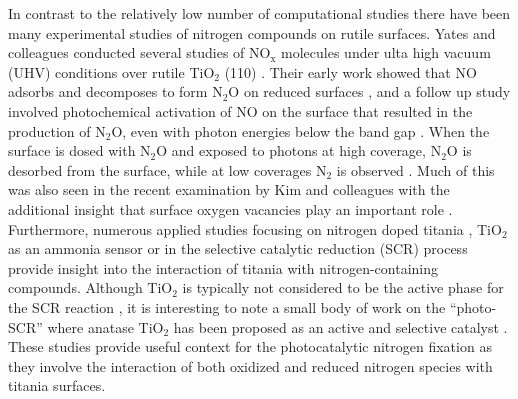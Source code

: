 \documentclass[journal=ascecg,manuscript=article,articletitle=true]{achemso}
\begin{document}
In contrast to the relatively low number of computational studies there have been many experimental studies of nitrogen compounds on rutile surfaces. Yates and colleagues conducted several studies of NO$_{\mathrm{x}}$ molecules under ulta high vacuum (UHV) conditions over rutile TiO$_2$ (110) \cite{Lu1994,Rusu2000,Rusu2001}. Their early work showed that NO adsorbs and decomposes to form N$_2$O on reduced surfaces \cite{Lu1994}, and a follow up study involved photochemical activation of NO on the surface that resulted in the production of N$_2$O, even with photon energies below the band gap \cite{Rusu2000}. When the surface is dosed with N$_2$O and exposed to photons at high coverage, N$_2$O is desorbed from the surface, while at low coverages N$_2$ is observed \cite{Rusu2001}. Much of this was also seen in the recent examination by Kim and colleagues with the additional insight that surface oxygen vacancies play an important role \cite{Kim2016,Kim2014}. Furthermore, numerous applied studies focusing on nitrogen doped titania \cite{Chen_2007}, TiO$_2$ as an ammonia sensor \cite{Karunagaran_2007,Suganuma_2015} or in the selective catalytic reduction (SCR) process \cite{Busca_1998,Ramis_1990,Giraud_2014,Liu_2017} provide insight into the interaction of titania with nitrogen-containing compounds. Although TiO$_2$ is typically not considered to be the active phase for the SCR reaction \cite{Topsoe_1994}, it is interesting to note a small body of work on the ``photo-SCR'' where anatase TiO$_2$ has been proposed as an active and selective catalyst \cite{Teramura_2002,Teramura_2003,Teramura_2004,Yamazoe_2006,Yamazoe_2007,Yamamoto_2013,Lasek_2013,Ji_2014}. These studies provide useful context for the photocatalytic nitrogen fixation as they involve the interaction of both oxidized and reduced nitrogen species with titania surfaces.
\end{document}
